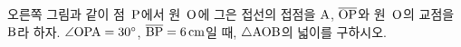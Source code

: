 \noindent\begin{minipage}[t]{0.58\linewidth}\vspace{0pt}\raggedright 오른쪽 그림과 같이 점~$\mathrm{P}$에서 원~$\mathrm{O}$에 그은 접선의 접점을 $\mathrm{A}$, $\overline{\mathrm{OP}}$와 원~$\mathrm{O}$의 교점을 $\mathrm{B}$라 하자. $\angle\mathrm{OPA}=30^\circ$, $\overline{\mathrm{BP}}=6\,\mathrm{cm}$일 때, $\triangle\mathrm{AOB}$의 넓이를 구하시오.\end{minipage}\hfill\begin{minipage}[t]{0.4\linewidth}\vspace{0pt}\centering \resizebox{\ifdim\width>\linewidth\linewidth\else\width\fi}{!}{}\end{minipage}\par

